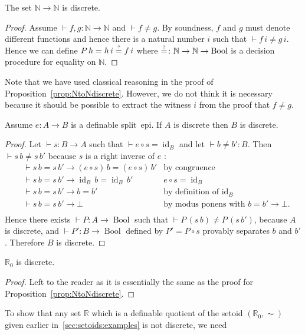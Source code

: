 \documentclass[envcountsame]{llncs}
\newcommand{\N}{\mathbb{N}}
\newcommand{\R}{\mathbb{R}}
\DeclareMathOperator{\Bool}{Bool}
\DeclareMathOperator{\id}{id}
\newcommand{\eqqm}{\overset{\text{\tiny ?}}{=}}
\begin{document}
\begin{proposition}\label{prop:NtoNdiscrete}
The set $\N\to\N$ is discrete.
\end{proposition}
\begin{proof}
Assume $\vdash f, g\colon \N \to \N$ and $\vdash f\neq g$. By soundness, $f$ and $g$ must denote different functions and hence there is a natural number $i$ such that $\vdash f\,i\neq g\,i$. Hence we can define $P\,h = {h\,i} \eqqm {f\,i}$ where ${\eqqm}\colon \N\to\N\to\Bool$ is a decision procedure for equality on $\N$.
\end{proof}

Note that we have used classical reasoning in the proof of Proposition~\ref{prop:NtoNdiscrete}. However, we do not think it is necessary because it should be possible to extract the witness $i$ from the proof that $f\neq g$.

\begin{proposition}\label{prop:splitepidiscrete}
Assume $ e\colon A\to B$ is a definable split~epi.  If $A$ is discrete then $B$ is discrete.
\end{proposition}
\begin{proof}
Let $\vdash s\colon B\to A$ such that $\vdash e \circ s=\id_B$ and let $\vdash b\neq b'\colon B$. Then $\vdash s\,b\neq s\,b'$ because  $s$ is a right inverse of $e$ :
\begin{align*}
&\vdash s\,b = s\,b'\to (e\circ s)\, b = (e\circ s)\,b'&\text{by congruence}  \\
&\vdash s\,b = s\,b'\to \id_B\, b = \id_B\,b'&e\circ s = \id_B  \\
&\vdash s\,b = s\,b'\to b = b'&\text{by definition of $\id_B$}\\
&\vdash s\,b = s\,b'\to \bot&\text{by modus ponens with $b=b'\to\bot.$}\\
\end{align*}Hence there exists $\vdash P\colon A\to\Bool$ such that $\vdash P\,(s\,b)\neq P\,(s\,b')$, because $A$ is discrete, and  $\vdash P'\colon B\to\Bool$ defined by $P' = P\circ s$ provably separates $b$ and $b'$.
Therefore $B$ is discrete.
\end{proof}

\begin{proposition}\label{prop:RZdiscrete}
 $\R_0$ is discrete.
\end{proposition}
\begin{proof}
Left to the reader as it is essentially the same as the proof for Proposition~\ref{prop:NtoNdiscrete}.
\end{proof}
To show that any set $\R$ which is a definable quotient of the setoid $(\R_0,\sim)$ given earlier in~\ref{sec:setoids:examples} is not discrete, we need
\end{document}
